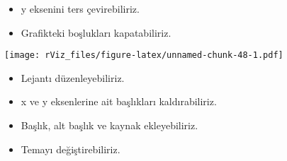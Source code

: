 \documentclass[
]{book}
\newenvironment{Shaded}{\begin{snugshade}}{\end{snugshade}}
\newcommand{\DataTypeTok}[1]{\textcolor[rgb]{0.13,0.29,0.53}{#1}}
\newcommand{\DecValTok}[1]{\textcolor[rgb]{0.00,0.00,0.81}{#1}}
\newcommand{\KeywordTok}[1]{\textcolor[rgb]{0.13,0.29,0.53}{\textbf{#1}}}
\newcommand{\NormalTok}[1]{#1}
\newcommand{\OperatorTok}[1]{\textcolor[rgb]{0.81,0.36,0.00}{\textbf{#1}}}
\newcommand{\StringTok}[1]{\textcolor[rgb]{0.31,0.60,0.02}{#1}}
\begin{document}
\begin{itemize}
\item
  y eksenini ters çevirebiliriz.
\item
  Grafikteki boşlukları kapatabiliriz.
\end{itemize}

\begin{Shaded}
\end{Shaded}

\texttt{[image: rViz\_files/figure-latex/unnamed-chunk-48-1.pdf]}

\begin{itemize}
\item
  Lejantı düzenleyebiliriz.
\item
  x ve y eksenlerine ait başlıkları kaldırabiliriz.
\item
  Başlık, alt başlık ve kaynak ekleyebiliriz.
\item
  Temayı değiştirebiliriz.
\end{itemize}
\end{document}
